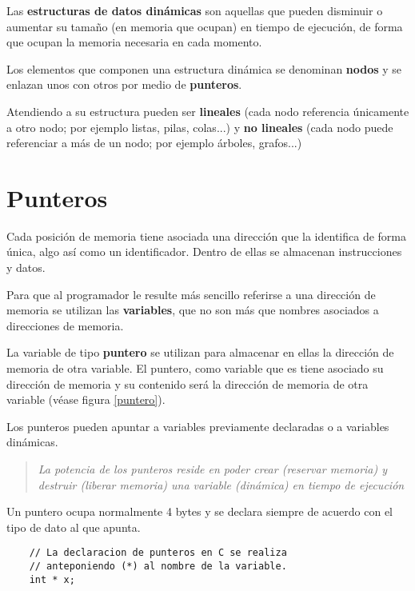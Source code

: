 \documentclass[a4paper, 11pt, titlepage]{article}
\begin{document}
Las \textbf{estructuras de datos dinámicas} son aquellas que pueden disminuir o aumentar su 
tamaño (en memoria que ocupan) en tiempo de ejecución, de forma que ocupan la memoria necesaria
en cada momento.

Los elementos que componen una estructura dinámica se denominan \textbf{nodos} y se enlazan unos
con otros por medio de \textbf{punteros}.

Atendiendo a su estructura pueden ser \textbf{lineales} (cada nodo referencia únicamente a 
otro nodo; por ejemplo listas, pilas, colas...) y \textbf{no lineales} (cada nodo puede referenciar
a más de un nodo; por ejemplo árboles, grafos...)

\section{Punteros}

Cada posición de memoria tiene asociada una dirección que la identifica de forma única, algo así
como un identificador. Dentro de ellas se almacenan instrucciones y datos.

Para que al programador le resulte más sencillo referirse a una dirección de memoria se utilizan
las \textbf{variables}, que no son más que nombres asociados a direcciones de memoria.

La variable de tipo \textbf{puntero} se utilizan para almacenar en ellas la dirección de memoria 
de otra variable. El puntero, como variable que es tiene asociado su dirección de memoria y su contenido 
será la dirección de memoria de otra variable (véase figura \ref{puntero}).



Los punteros pueden apuntar a variables previamente declaradas o a variables dinámicas.

    \begin{quote}
        \small \textit{La potencia de los punteros reside en poder crear (reservar memoria) y 
        destruir (liberar memoria) una variable (dinámica) en tiempo de ejecución}
    \end{quote}

Un puntero ocupa normalmente 4 bytes y se declara siempre de acuerdo con el tipo de dato al que apunta.

    \begin{lstlisting}
    // La declaracion de punteros en C se realiza 
    // anteponiendo (*) al nombre de la variable.
    int * x;
    \end{lstlisting}
\end{document}
